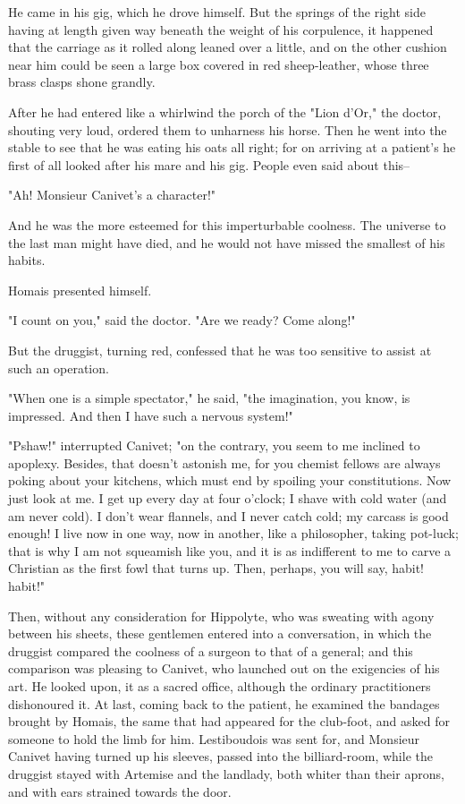 \documentclass{tufte-book}
\begin{document}
He came in his gig, which he drove himself. But the springs of the right
side having at length given way beneath the weight of his corpulence, it
happened that the carriage as it rolled along leaned over a little, and
on the other cushion near him could be seen a large box covered in red
sheep-leather, whose three brass clasps shone grandly.

After he had entered like a whirlwind the porch of the "Lion d'Or," the
doctor, shouting very loud, ordered them to unharness his horse. Then he
went into the stable to see that he was eating his oats all right; for
on arriving at a patient's he first of all looked after his mare and his
gig. People even said about this--

"Ah! Monsieur Canivet's a character!"

And he was the more esteemed for this imperturbable coolness. The
universe to the last man might have died, and he would not have missed
the smallest of his habits.

Homais presented himself.

"I count on you," said the doctor. "Are we ready? Come along!"

But the druggist, turning red, confessed that he was too sensitive to
assist at such an operation.

"When one is a simple spectator," he said, "the imagination, you know,
is impressed. And then I have such a nervous system!"

"Pshaw!" interrupted Canivet; "on the contrary, you seem to me inclined
to apoplexy. Besides, that doesn't astonish me, for you chemist fellows
are always poking about your kitchens, which must end by spoiling your
constitutions. Now just look at me. I get up every day at four o'clock;
I shave with cold water (and am never cold). I don't wear flannels, and
I never catch cold; my carcass is good enough! I live now in one way,
now in another, like a philosopher, taking pot-luck; that is why I
am not squeamish like you, and it is as indifferent to me to carve a
Christian as the first fowl that turns up. Then, perhaps, you will say,
habit! habit!"

Then, without any consideration for Hippolyte, who was sweating with
agony between his sheets, these gentlemen entered into a conversation,
in which the druggist compared the coolness of a surgeon to that of a
general; and this comparison was pleasing to Canivet, who launched out
on the exigencies of his art. He looked upon, it as a sacred office,
although the ordinary practitioners dishonoured it. At last, coming back
to the patient, he examined the bandages brought by Homais, the same
that had appeared for the club-foot, and asked for someone to hold the
limb for him. Lestiboudois was sent for, and Monsieur Canivet having
turned up his sleeves, passed into the billiard-room, while the druggist
stayed with Artemise and the landlady, both whiter than their aprons,
and with ears strained towards the door.
\end{document}
